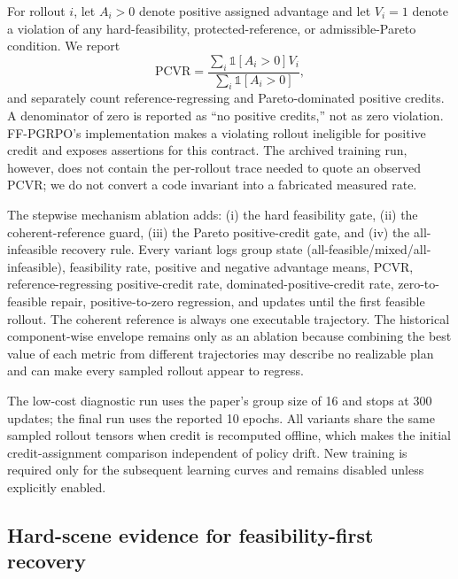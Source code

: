 For rollout $i$, let $A_i>0$ denote positive assigned advantage and let
$V_i=1$ denote a violation of any hard-feasibility, protected-reference, or
admissible-Pareto condition.  We report
\begin{equation}
  \mathrm{PCVR} =
  \frac{\sum_i \mathbb{1}[A_i>0]V_i}
       {\sum_i \mathbb{1}[A_i>0]},
  \label{eq:positive-credit-violation}
\end{equation}
and separately count reference-regressing and Pareto-dominated positive
credits.  A denominator of zero is reported as ``no positive credits,'' not as
zero violation.  FF-PGRPO's implementation makes a violating rollout
ineligible for positive credit and exposes assertions for this contract.  The
archived training run, however, does not contain the per-rollout trace needed
to quote an observed PCVR; we do not convert a code invariant into a fabricated
measured rate.

The stepwise mechanism ablation adds: (i) the hard feasibility gate, (ii) the
coherent-reference guard, (iii) the Pareto positive-credit gate, and (iv) the
all-infeasible recovery rule.  Every variant logs group state
(all-feasible/mixed/all-infeasible), feasibility rate, positive and negative
advantage means, PCVR, reference-regressing positive-credit rate,
dominated-positive-credit rate, zero-to-feasible repair, positive-to-zero
regression, and updates until the first feasible rollout.  The coherent
reference is always one executable trajectory.  The historical
component-wise envelope remains only as an ablation because combining the best
value of each metric from different trajectories may describe no realizable
plan and can make every sampled rollout appear to regress.

The low-cost diagnostic run uses the paper's group size of 16 and stops at 300
updates; the final run uses the reported 10 epochs.  All variants share the
same sampled rollout tensors when credit is recomputed offline, which makes
the initial credit-assignment comparison independent of policy drift.  New
training is required only for the subsequent learning curves and remains
disabled unless explicitly enabled.

\subsection{Hard-scene evidence for feasibility-first recovery}
\label{sec:ffpgrpo-hard-evidence}


